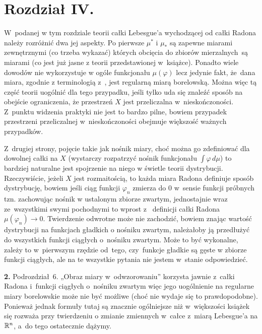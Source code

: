 \documentclass[a4paper,11pt]{article}
\numberwithin{equation}{section}
\begin{document}
\section{Rozdział IV.}


\noindent
W~podanej w tym rozdziale teorii całki Lebesgue’a wychodzącej
od całki Radona należy rozróżnić dwa jej aspekty. Po pierwsze
$\mu^{ * }$ i $\mu_{ * }$ są zapewne miarami zewnętrznymi (co trzeba
wykazać) których obcięcia do zbiorów mierzalnych~są miarami (co jest
już jasne z teorii przedstawionej w~książce). Ponadto wiele dowodów
nie wykorzystuje w ogóle funkcjonału $\mu( \varphi )$ lecz jedynie
fakt, że~dana miara, zgodnie z terminologią
z~\cite{RudinAnalizaRzeczywistaIZespolona1998}, jest regularną miarą
borelowską. Można więc tą część teorii uogólnić dla tego przypadku,
jeśli tylko uda się znaleźć sposób na obejście ograniczenia, że
przestrzeń $X$ jest przeliczalna w~nieskończoności. Z~punktu widzenia
praktyki nie jest to bardzo pilne, bowiem przypadek przestrzeni
przeliczalnej w~nieskończoności obejmuje większość ważnych przypadków.

Z~drugiej strony, pojęcie takie jak nośnik miary, choć można go
zdefiniować dla dowolnej całki na $X$ (wystarczy rozpatrzyć nośnik
funkcjonału $\int \varphi \, d\mu$) to bardziej naturalne jest
spojrzenie na niego w świetle teorii dystrybucji. Rzeczywiście, jeżeli
$X$ jest rozmaitością, to każda miara Radona definiuje sposób
dystrybucję, bowiem jeśli ciąg funkcji $\varphi_{ n }$ zmierza do 0
w~sensie funkcji próbnych tzn. zachowując nośnik w ustalonym zbiorze
zwartym, jednostajnie wraz ze~wszystkimi swymi pochodnymi to wprost z~
definicji całki Radona $\mu( \varphi_{ n } ) \to 0$. Twierdzenie
odwrotne może nie zachodzić, bowiem znając wartość dystrybucji na
funkcjach gładkich o nośniku zwartym, należałoby ją przedłużyć do
wszystkich funkcji ciągłych o~nośniku zwartym. Może to być wykonalne,
zależy to w~pierwszym rzędzie od~tego, czy~funkcje gładkie są gęste w
zbiorze funkcji ciągłych, ale na te wszystkie pytania nie jestem
w~stanie odpowiedzieć.

\VerSpaceFour




\noindent
\textbf{2.} Podrozdział~6. „Obraz miary w~odwzorowaniu”
korzysta jawnie z~całki Radona i~funkcji ciągłych o~nośniku zwartym
więc jego uogólnienie na regularne miary borelowskie może nie być
możliwe (choć nie wydaje się to prawdopodobne). Ponieważ jednak
formuły tutaj są znacznie ogólniejsze niż w~większości książek się
rozważa przy twierdzeniu o zmianie zmiennych w~całce z~miarą
Lebesgue’a na $\mathbb{R}^{ n }$, a~do tego ostatecznie dążymy.
\end{document}
